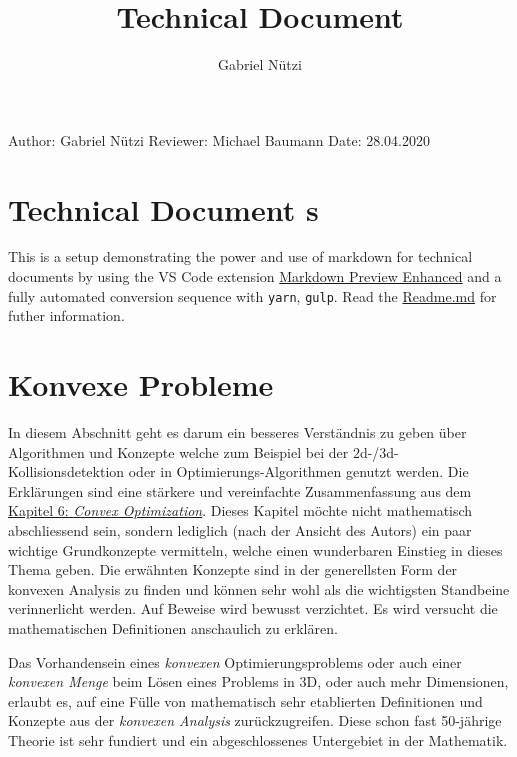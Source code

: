 \documentclass[
  12pt,
  a4paper,
  twoside,
  titlepage,
  openright,
  numbers=noenddot,
  chapterprefix=true,
  headings=optiontohead,
  svgnames,
  dvipsnames]{scrreprt}
\title{Technical Document}
\author{Gabriel Nützi}
\date{}
\begin{document}
\maketitle

{
\hypersetup{linkcolor=DarkGreen}
\setcounter{tocdepth}{1}
\tableofcontents
}
Author: Gabriel Nützi Reviewer: Michael Baumann Date: 28.04.2020

\hypertarget{technical-document-s}{%
\chapter{Technical Document s}\label{technical-document-s}}

This is a setup demonstrating the power and use of markdown for
technical documents by using the VS Code extension
\href{https://shd101wyy.github.io/markdown-preview-enhanced}{Markdown
Preview Enhanced} and a fully automated conversion sequence with
\texttt{yarn}, \texttt{gulp}. Read the
\href{https://github.com/gabyx/TechnicalMarkdown/blob/master/Readme.md}{Readme.md}
for futher information.

\hypertarget{konvexe-probleme}{%
\chapter{Konvexe Probleme}\label{konvexe-probleme}}

In diesem Abschnitt geht es darum ein besseres Verständnis zu geben über
Algorithmen und Konzepte welche zum Beispiel bei der
\(2\)d-/\(3\)d-Kollisionsdetektion oder in Optimierungs-Algorithmen
genutzt werden. Die Erklärungen sind eine stärkere und vereinfachte
Zusammenfassung aus dem
\href{http://dx.doi.org/10.3929/ethz-a-010662262}{Kapitel 6:
\emph{Convex Optimization}}. Dieses Kapitel möchte nicht mathematisch
abschliessend sein, sondern lediglich (nach der Ansicht des Autors) ein
paar wichtige Grundkonzepte vermitteln, welche einen wunderbaren
Einstieg in dieses Thema geben. Die erwähnten Konzepte sind in der
generellsten Form der konvexen Analysis zu finden und können sehr wohl
als die wichtigsten Standbeine verinnerlicht werden. Auf Beweise wird
bewusst verzichtet. Es wird versucht die mathematischen Definitionen
anschaulich zu erklären.

Das Vorhandensein eines \emph{konvexen} Optimierungsproblems oder auch
einer \emph{konvexen Menge} beim Lösen eines Problems in \(3\)D, oder
auch mehr Dimensionen, erlaubt es, auf eine Fülle von mathematisch sehr
etablierten Definitionen und Konzepte aus der \emph{konvexen Analysis}
zurückzugreifen. Diese schon fast 50-jährige Theorie ist sehr fundiert
und ein abgeschlossenes Untergebiet in der Mathematik.
\end{document}
